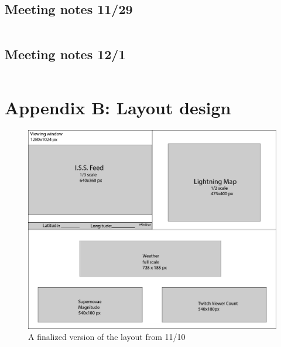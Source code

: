 \documentclass{article}
\begin{document}
\subsection{Meeting notes 11/29}
\inputminted[breaklines=true, linenos=true]{text}{../meeting_notes/meeting_notes_11_29.txt}

\subsection{Meeting notes 12/1}
\inputminted[breaklines=true, linenos=true]{text}{../meeting_notes/meeting_notes_12_1.txt}

\newpage
\section{Appendix B: Layout design}
\begin{figure}[h!]
  \includegraphics[width=\linewidth]{../layout/cs_3505_space_data_layout.png}
  \caption{A finalized version of the layout from 11/10}
\end{figure}
\end{document}
